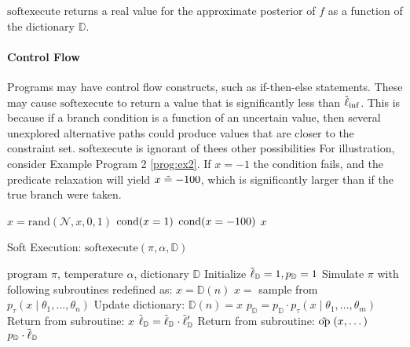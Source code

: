 $\textrm{softexecute}$ returns a real value for the approximate posterior of $f$ as a function of the dictionary $\mathbb{D}$.

\paragraph{Control Flow}
Programs may have control flow constructs, such as if-then-else statements.
These may cause $\textrm{softexecute}$ to return a value that is significantly less than $\mathrel{\tilde{\operatorname{\ell}}}_{\inf}$.
This is because if a branch condition is a function of an uncertain value, then several unexplored alternative paths could produce values that are closer to the constraint set.
$\textrm{softexecute}$ is ignorant of thees other possibilities
For illustration, consider Example Program 2 \ref{prog:ex2}.
If $x = -1$ the condition fails, and the predicate relaxation will yield $x \mathrel{\tilde{=}} -100$, which is significantly larger than if the true branch were taken.

\begin{exprogram}[tb]
\caption{}
\label{prog:ex2}
\begin{algorithmic}
\STATE $x = \textrm{rand}(\mathcal{N}, x, 0, 1)$
\STATE $\operatorname{cond}(x = 1)$
\ELSE
\STATE $\operatorname{cond}(x = -100)$
\ENDIF
{} $x$
\end{algorithmic}
\end{exprogram}



\begin{algorithm}[tb]
  \caption{Soft Execution: $\textrm{softexecute}(\pi, \alpha, \mathbb{D})$}
  \label{alg:softexecute}
\begin{algorithmic}
 program $\pi$, temperature $\alpha$, dictionary $\mathbb{D}$
\STATE Initialize $\tilde{\operatorname{\ell}}_\mathbb{D} = 1, p_\mathbb{D} = 1$
\STATE Simulate $\pi$ with following subroutines redefined as:   
   \STATE $x = \mathbb{D}(n)$
 \ELSE
   \STATE $x = $ sample from $p_\tau(x \mid \theta_1, ..., \theta_n)$
   \STATE Update dictionary: $\mathbb{D}(n) = x$
 \ENDIF
 \STATE $p_\mathbb{D} = p_\mathbb{D} \cdot p_\tau(x \mid \theta_1, ..., \theta_m)$
 \STATE Return from subroutine: $x$
\ENDALOOP
\STATE
{}
  \STATE $\tilde{\operatorname{\ell}}_\mathbb{D} = \tilde{\operatorname{\ell}}_\mathbb{D} \cdot \tilde{\operatorname{\ell}}_\mathbb{D}'$
\ENDALOOP
\STATE
{}
  \STATE Return from subroutine: $\mathrel{\tilde{\textrm{op}}}(x, \dots)$ 
\ENDALOOP
\STATE
{} $p_\mathbb{D} \cdot \tilde{\operatorname{\ell}}_\mathbb{D}$
\end{algorithmic}
\end{algorithm}

